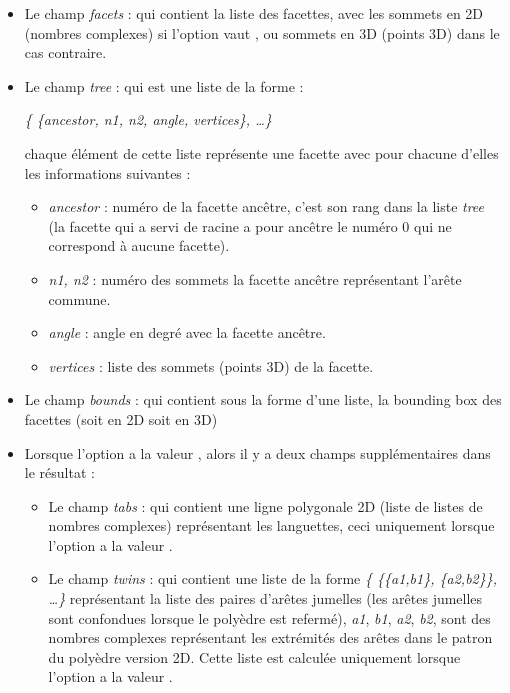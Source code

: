    \begin{itemize}
        \item Le champ \emph{facets} : qui contient la liste des facettes, avec les sommets en 2D (nombres complexes) si l'option  vaut \true, ou sommets en 3D (points 3D) dans le cas contraire.
        
        \item Le champ \emph{tree} : qui est une liste de la forme : \par
        \hfil\emph{\{ \{ancestor, n1, n2, angle, vertices\}, \ldots\} }\hfil\par
    chaque élément de cette liste représente une facette avec pour chacune d'elles les informations suivantes :
        \begin{itemize}
            \item \emph{ancestor} : numéro de la facette ancêtre, c'est son rang dans la liste \emph{tree} (la facette qui a servi de racine a pour ancêtre le numéro $0$ qui ne correspond à aucune facette).
            
            \item \emph{n1, n2} : numéro des sommets la facette ancêtre représentant l'arête commune.
            
            \item \emph{angle} : angle en degré avec la facette ancêtre.
            
            \item \emph{vertices} : liste des sommets (points 3D) de la facette.
        \end{itemize}
        
        \item Le champ \emph{bounds} : qui contient sous la forme d'une liste, la bounding box des facettes (soit en 2D soit en 3D)
        \item Lorsque l'option  a la valeur \true, alors il y a deux champs supplémentaires dans le résultat :
            \begin{itemize}
                \item Le champ \emph{tabs} : qui contient une ligne polygonale 2D (liste de listes de nombres complexes) représentant les languettes, ceci uniquement lorsque l'option  a la valeur \true.
                
                \item Le champ \emph{twins} : qui contient une liste de la forme \emph{\{ \{\{a1,b1\}, \{a2,b2\}\}, \ldots\}} représentant la liste des paires d'arêtes jumelles (les arêtes jumelles sont confondues lorsque le polyèdre est refermé), \emph{a1}, \emph{b1}, \emph{a2}, \emph{b2}, sont des nombres complexes représentant les extrémités des arêtes dans le patron du polyèdre version 2D. Cette liste est calculée uniquement lorsque l'option  a la valeur \true.
            \end{itemize}
    \end{itemize}
    
